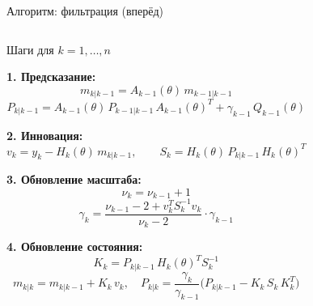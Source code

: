 \documentclass{beamer}
\begin{document}
\begin{frame}{Алгоритм: фильтрация (вперёд)}
\begin{columns}[T]
    \begin{block}{\footnotesize Шаги для $k = 1, \ldots, n$}
        \vspace{2pt}

        \textbf{1. Предсказание:}
        \vspace{-4pt}
        $$
            m_{k|k-1} = A_{k-1}(\theta)\,m_{k-1|k-1}
        $$
        \vspace{-14pt}
        $$
            P_{k|k-1} = A_{k-1}(\theta)\,P_{k-1|k-1}\,A_{k-1}(\theta)^T
            + \gamma_{k-1}\,Q_{k-1}(\theta)
        $$

        \textbf{2. Инновация:}
        \vspace{-4pt}
        $$
            v_k = y_k - H_k(\theta)\,m_{k|k-1}, \qquad
            S_k = H_k(\theta)\,P_{k|k-1}\,H_k(\theta)^T
        $$

        \textbf{3. Обновление масштаба:}
        \vspace{-4pt}
        $$
            \nu_k = \nu_{k-1} + 1
        $$
        \vspace{-14pt}
        $$
            \gamma_k = \frac{\nu_{k-1} - 2 + v_k^T S_k^{-1} v_k}{\nu_k - 2}
            \cdot \gamma_{k-1}
        $$

        \textbf{4. Обновление состояния:}
        \vspace{-4pt}
        $$
            K_k = P_{k|k-1}\,H_k(\theta)^T S_k^{-1}
        $$
        \vspace{-14pt}
        $$
            m_{k|k} = m_{k|k-1} + K_k\,v_k, \quad
            P_{k|k} = \frac{\gamma_{k}}{\gamma_{k-1}}
            \bigl(P_{k|k-1} - K_k\,S_k\,K_k^T\bigr)
        $$
    \end{block}

\end{columns}

\end{frame}
\end{document}
